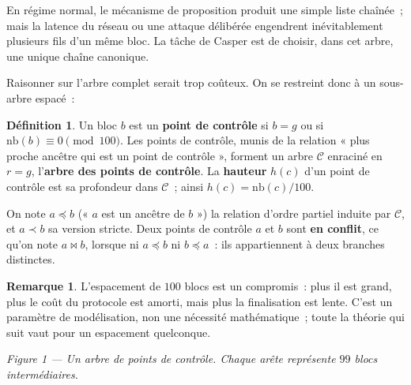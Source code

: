 \documentclass[11pt,a4paper]{article}
\theoremstyle{plain}
\theoremstyle{definition}
\newtheorem{defi}[theoreme]{Définition}
\newtheorem{remarque}[theoreme]{Remarque}
\newcommand{\Cc}{\mathcal{C}}
\newcommand{\anc}{\preccurlyeq}
\newcommand{\ancs}{\prec}
\begin{document}
En régime normal, le mécanisme de proposition produit une simple liste chaînée~; mais la
latence du réseau ou une attaque délibérée engendrent inévitablement plusieurs fils d'un même
bloc. La tâche de Casper est de choisir, dans cet arbre, une unique chaîne canonique.

Raisonner sur l'arbre complet serait trop coûteux. On se restreint donc à un sous-arbre
espacé~:

\begin{defi}
Un bloc $b$ est un \textbf{point de contrôle} si $b=g$ ou si $\mathrm{nb}(b)\equiv 0
\pmod{100}$. Les points de contrôle, munis de la relation « plus proche ancêtre qui est un
point de contrôle », forment un arbre $\Cc$ enraciné en $r=g$, l'\textbf{arbre des points de
contrôle}. La \textbf{hauteur} $h(c)$ d'un point de contrôle est sa profondeur dans $\Cc$~;
ainsi $h(c)=\mathrm{nb}(c)/100$.
\end{defi}

On note $a\anc b$ (« $a$ est un ancêtre de $b$ ») la relation d'ordre partiel induite par
$\Cc$, et $a\ancs b$ sa version stricte. Deux points de contrôle $a$ et $b$ sont
\textbf{en conflit}, ce qu'on note $a\bowtie b$, lorsque ni $a\anc b$ ni $b\anc a$~: ils
appartiennent à deux branches distinctes.

\begin{remarque}
L'espacement de $100$ blocs est un compromis~: plus il est grand, plus le coût du protocole
est amorti, mais plus la finalisation est lente. C'est un paramètre de modélisation, non une
nécessité mathématique~; toute la théorie qui suit vaut pour un espacement quelconque.
\end{remarque}

\begin{center}

{\footnotesize\itshape Figure 1 --- Un arbre de points de contrôle. Chaque arête représente
$99$ blocs intermédiaires.}
\end{center}
\end{document}
